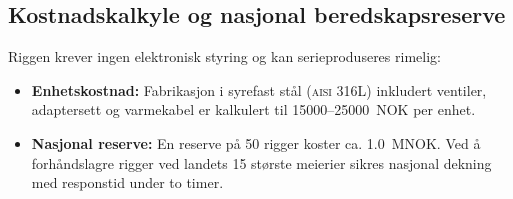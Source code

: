 \subsection{Kostnadskalkyle og nasjonal beredskapsreserve}
Riggen krever ingen elektronisk styring og kan serieproduseres rimelig:
\begin{itemize}[leftmargin=1.5em, itemsep=0.2em]
    \item \textbf{Enhetskostnad:} Fabrikasjon i syrefast stål (\textsc{aisi} 316L) inkludert ventiler, adaptersett og varmekabel er kalkulert til \num{15000}--\SI{25000}{NOK} per enhet.
    \item \textbf{Nasjonal reserve:} En reserve på 50 rigger koster ca. \SI{1.0}{MNOK}. Ved å forhåndslagre rigger ved landets 15 største meierier sikres nasjonal dekning med responstid under to timer.
\end{itemize}
